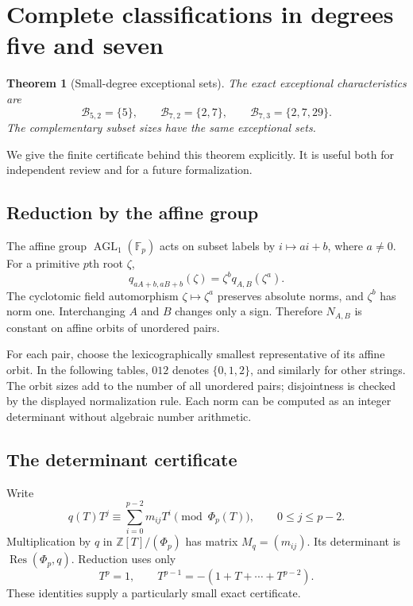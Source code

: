 \documentclass[11pt,a4paper]{article}
\newtheorem{theorem}{Theorem}[section]
\theoremstyle{definition}
\theoremstyle{remark}
\newcommand{\Z}{\mathbb Z}
\newcommand{\F}{\mathbb F}
\newcommand{\Res}{\operatorname{Res}}
\newcommand{\AGL}{\operatorname{AGL}}
\begin{document}
\section{Complete classifications in degrees five and seven}
\label{rss:sec:tables}

\begin{theorem}[Small-degree exceptional sets]\label{rss:thm:small}
The exact exceptional characteristics are
\[
 \boxed{\mathcal B_{5,2}=\{5\}},\qquad
 \boxed{\mathcal B_{7,2}=\{2,7\}},\qquad
 \boxed{\mathcal B_{7,3}=\{2,7,29\}}.
\]
The complementary subset sizes have the same exceptional sets.
\end{theorem}

We give the finite certificate behind this theorem explicitly. It is useful
both for independent review and for a future formalization.

\subsection{Reduction by the affine group}

The affine group $\AGL_1(\F_p)$ acts on subset labels by
$i\mapsto ai+b$, where $a\neq0$. For a primitive $p$th root $\zeta$,
\[
 q_{aA+b,aB+b}(\zeta)=\zeta^b q_{A,B}(\zeta^a).
\]
The cyclotomic field automorphism $\zeta\mapsto\zeta^a$ preserves absolute
norms, and $\zeta^b$ has norm one. Interchanging $A$ and $B$ changes only a
sign. Therefore $N_{A,B}$ is constant on affine orbits of unordered pairs.

For each pair, choose the lexicographically smallest representative of its
affine orbit. In the following tables, $012$ denotes $\{0,1,2\}$, and
similarly for other strings. The orbit sizes add to the number of all
unordered pairs; disjointness is checked by the displayed normalization rule.
Each norm can be computed as an integer determinant without algebraic
number arithmetic.

\subsection{The determinant certificate}

Write
\[
 q(T)T^j\equiv\sum_{i=0}^{p-2}m_{ij}T^i\pmod{\Phi_p(T)},
 \qquad 0\leq j\leq p-2.
\]
Multiplication by $q$ in $\Z[T]/(\Phi_p)$ has matrix $M_q=(m_{ij})$.
Its determinant is $\Res(\Phi_p,q)$. Reduction uses only
\[
 T^p=1,\qquad T^{p-1}=-(1+T+\cdots+T^{p-2}).
\]
These identities supply a particularly small exact certificate.
\end{document}
